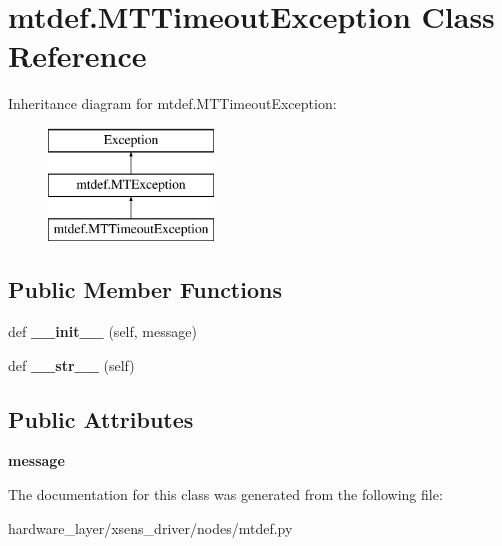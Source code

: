 \hypertarget{classmtdef_1_1MTTimeoutException}{}\section{mtdef.\+M\+T\+Timeout\+Exception Class Reference}
\label{classmtdef_1_1MTTimeoutException}
Inheritance diagram for mtdef.\+M\+T\+Timeout\+Exception\+:\begin{figure}[H]
\begin{center}
\leavevmode
\includegraphics[height=3.000000cm]{classmtdef_1_1MTTimeoutException}
\end{center}
\end{figure}
\subsection*{Public Member Functions}
\begin{DoxyCompactItemize}
\item 
\mbox{\label{classmtdef_1_1MTTimeoutException_a229abababab998d9d19d36ee43dfc1c9}} 
def {\bfseries \+\_\+\+\_\+init\+\_\+\+\_\+} (self, message)
\item 
\mbox{\label{classmtdef_1_1MTTimeoutException_aed8d585a2f621e2b014daa2469f5ebbf}} 
def {\bfseries \+\_\+\+\_\+str\+\_\+\+\_\+} (self)
\end{DoxyCompactItemize}
\subsection*{Public Attributes}
\begin{DoxyCompactItemize}
\item 
\mbox{\label{classmtdef_1_1MTTimeoutException_a6a33546be98bcca71867a978faa67e74}} 
{\bfseries message}
\end{DoxyCompactItemize}


The documentation for this class was generated from the following file\+:\begin{DoxyCompactItemize}
\item 
hardware\+\_\+layer/xsens\+\_\+driver/nodes/mtdef.\+py\end{DoxyCompactItemize}
